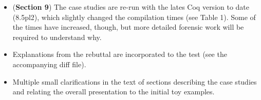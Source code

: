 \documentclass{article}
\begin{document}
\begin{itemize}

\item (\textbf{Section 9}) The case studies are re-run with the lates
  Coq version to date (8.5pl2), which slightly changed the compilation
  times (see Table 1). Some of the times have increased, though, but
  more detailed forensic work will be required to understand why.

\item Explanations from the rebuttal are incorporated to the test
    (see the accompanying diff file).

\item Multiple small clarifications in the text of sections
    describing the case studies and relating the overall presentation
    to the initial toy examples.

\end{itemize}


\end{document}

